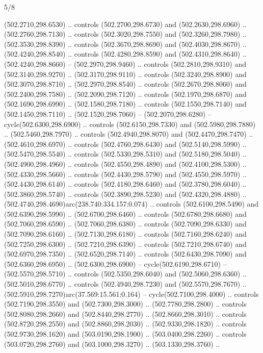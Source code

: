 \begin{flagdescription}{5/8}
\begin{scope}[xshift=0.5\flaglength,yshift=0.5\flagwidth,scale=\flagwidth/475.63]
\begin{scope}[y=0.8pt, x=0.8pt, yscale=-1, xscale=1,shift={(-450,-300)}]
\begin{scope}[cm={{1.0,0.0,0.0,1.0,(-0.0002,0.12556)}},cm={{1.0,0.0,0.0,1.0,(0.00179,0.0)}}]
\begin{scope}[cm={{1.11592,0.0,0.0,1.11592,(-106.89933,-41.77764)}}]
\begin{scope}[draw=black,fill=cfff]
\begin{scope}[fill=black]
  (502.2710,298.6530) .. controls (502.2700,298.6730) and (502.2630,298.6960) ..
  (502.2760,298.7130) .. controls (502.3020,298.7550) and (502.3260,298.7980) ..
  (502.3530,298.8390) .. controls (502.3670,298.8690) and (502.4030,298.8670) ..
  (502.4240,298.8540) .. controls (502.4280,298.8590) and (502.4310,298.8640) ..
  (502.4240,298.8660) -- (502.2970,298.9460) .. controls (502.2810,298.9310) and
  (502.3140,298.9270) .. (502.3170,298.9110) .. controls (502.3240,298.8900) and
  (502.3070,298.8710) .. (502.2970,298.8540) .. controls (502.2670,298.8060) and
  (502.2400,298.7580) .. (502.2090,298.7120) .. controls (502.1970,298.6870) and
  (502.1690,298.6990) .. (502.1580,298.7180) .. controls (502.1550,298.7140) and
  (502.1450,298.7110) .. (502.1520,298.7060) -- (502.2070,298.6280) --
  cycle(502.6300,298.6900) .. controls (502.6150,298.7330) and
  (502.5980,298.7880) .. (502.5460,298.7970) .. controls (502.4940,298.8070) and
  (502.4470,298.7470) .. (502.4610,298.6970) .. controls (502.4760,298.6430) and
  (502.5140,298.5990) .. (502.5470,298.5540) .. controls (502.5330,298.5310) and
  (502.5180,298.5040) .. (502.4900,298.4960) .. controls (502.4550,298.4890) and
  (502.4100,298.5300) .. (502.4330,298.5660) .. controls (502.4430,298.5790) and
  (502.4550,298.5970) .. (502.4430,298.6140) .. controls (502.4180,298.6460) and
  (502.3780,298.6040) .. (502.3860,298.5740) .. controls (502.3890,298.5230) and
  (502.4320,298.4880) .. (502.4740,298.4690)arc(238.740:334.157:0.074) ..
  controls (502.6100,298.5490) and (502.6390,298.5990) .. (502.6700,298.6460) ..
  controls (502.6780,298.6680) and (502.7060,298.6590) .. (502.7060,298.6380) ..
  controls (502.7090,298.6330) and (502.7090,298.6160) .. (502.7130,298.6180) ..
  controls (502.7160,298.6240) and (502.7250,298.6300) .. (502.7210,298.6390) ..
  controls (502.7210,298.6740) and (502.6970,298.7350) .. (502.6520,298.7140) ..
  controls (502.6430,298.7090) and (502.6360,298.6950) .. (502.6300,298.6900) --
  cycle(502.6190,298.6710) -- (502.5570,298.5710) .. controls
  (502.5350,298.6040) and (502.5060,298.6360) .. (502.5010,298.6770) .. controls
  (502.4940,298.7230) and (502.5570,298.7670) ..
  (502.5910,298.7270)arc(37.569:15.561:0.164) -- cycle(502.7100,298.4000) ..
  controls (502.7190,298.3550) and (502.7300,298.3000) .. (502.7780,298.2800) ..
  controls (502.8080,298.2660) and (502.8440,298.2770) .. (502.8660,298.3010) ..
  controls (502.8720,298.2550) and (502.8860,298.2030) .. (502.9330,298.1820) ..
  controls (502.9730,298.1620) and (503.0190,298.1900) .. (503.0400,298.2260) ..
  controls (503.0720,298.2760) and (503.1000,298.3270) .. (503.1330,298.3760) ..

\end{scope}
\end{scope}
\end{scope}
\end{scope}
\end{scope}
\end{scope}
\end{flagdescription}

